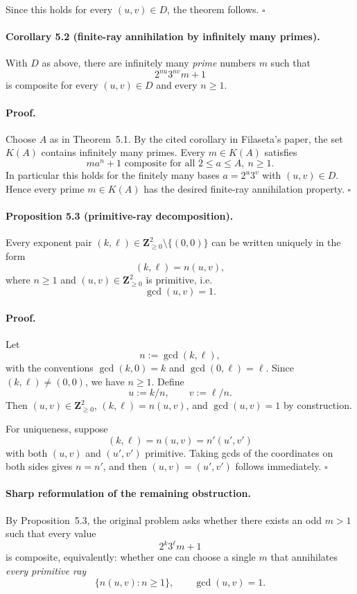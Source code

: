 Since this holds for every $(u,v)\in D$, the theorem follows.
\hfill $\square$

\paragraph{Corollary 5.2 (finite-ray annihilation by infinitely many primes).}
With $D$ as above, there are infinitely many \emph{prime} numbers $m$ such that
\[
2^{nu}3^{nv}m+1
\]
is composite for every $(u,v)\in D$ and every $n\ge 1$.

\paragraph{Proof.}
Choose $A$ as in Theorem~5.1. By the cited corollary in Filaseta's paper, the set $K(A)$ contains infinitely many primes. Every $m\in K(A)$ satisfies
\[
m a^n+1 \text{ composite for all } 2\le a\le A,\ n\ge 1.
\]
In particular this holds for the finitely many bases $a=2^u3^v$ with $(u,v)\in D$. Hence every prime $m\in K(A)$ has the desired finite-ray annihilation property.
\hfill $\square$

\paragraph{Proposition 5.3 (primitive-ray decomposition).}
Every exponent pair $(k,\ell)\in \mathbf{Z}_{\ge 0}^2\setminus \{(0,0)\}$ can be written uniquely in the form
\[
(k,\ell)=n(u,v),
\]
where $n\ge 1$ and $(u,v)\in \mathbf{Z}_{\ge 0}^2$ is primitive, i.e.
\[
\gcd(u,v)=1.
\]

\paragraph{Proof.}
Let
\[
n:=\gcd(k,\ell),
\]
with the conventions $\gcd(k,0)=k$ and $\gcd(0,\ell)=\ell$. Since $(k,\ell)\neq (0,0)$, we have $n\ge 1$. Define
\[
u:=k/n,\qquad v:=\ell/n.
\]
Then $(u,v)\in \mathbf{Z}_{\ge 0}^2$, $(k,\ell)=n(u,v)$, and $\gcd(u,v)=1$ by construction.

For uniqueness, suppose
\[
(k,\ell)=n(u,v)=n'(u',v')
\]
with both $(u,v)$ and $(u',v')$ primitive. Taking gcds of the coordinates on both sides gives $n=n'$, and then $(u,v)=(u',v')$ follows immediately.
\hfill $\square$

\paragraph{Sharp reformulation of the remaining obstruction.}
By Proposition~5.3, the original problem asks whether there exists an odd $m>1$ such that every value
\[
2^k3^\ell m+1
\]
is composite, equivalently: whether one can choose a single $m$ that annihilates \emph{every primitive ray}
\[
\{n(u,v):n\ge 1\}, \qquad \gcd(u,v)=1.
\]

